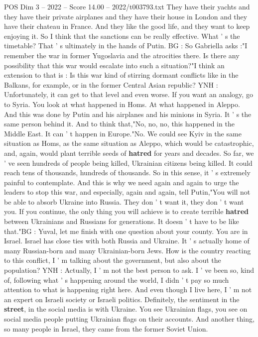 \begin{textsample}{POS Dim 3 – 2022 – Score 14.00 – 2022/t003793.txt}
They have their yachts and they have their private airplanes and they have their house in London and they have their chateau in France.
And they like the good life, and they want to keep enjoying it.
So I think that the sanctions can be really effective.
What ' s the timetable?
That ' s ultimately in the hands of Putin.
BG : So Gabriella asks :"I remember the war in former Yugoslavia and the atrocities there.
Is there any possibility that this war would escalate into such a situation?"I think an extension to that is : Is this war kind of stirring dormant conflicts like in the Balkans, for example, or in the former Central Asian republic?
YNH : Unfortunately, it can get to that level and even worse.
If you want an analogy, go to Syria.
You look at what happened in Homs.
At what happened in Aleppo.
And this was done by Putin and his airplanes and his minions in Syria.
It ' s the same person behind it.
And to think that,"No, no, no, this happened in the Middle East.
It can ' t happen in Europe."No.
We could see Kyiv in the same situation as Homs, as the same situation as Aleppo, which would be catastrophic, and, again, would plant terrible seeds of \textbf{hatred} for years and decades.
So far, we ' ve seen hundreds of people being killed, Ukrainian citizens being killed.
It could reach tens of thousands, hundreds of thousands.
So in this sense, it ' s extremely painful to contemplate.
And this is why we need again and again to urge the leaders to stop this war, and especially, again and again, tell Putin,"You will not be able to absorb Ukraine into Russia.
They don ' t want it, they don ' t want you.
If you continue, the only thing you will achieve is to create terrible \textbf{hatred} between Ukrainians and Russians for generations.
It doesn ' t have to be like that."BG : Yuval, let me finish with one question about your county.
You are in Israel.
Israel has close ties with both Russia and Ukraine.
It ' s actually home of many Russian-born and many Ukrainian-born Jews.
How is the country reacting to this conflict, I ' m talking about the government, but also about the population?
YNH : Actually, I ' m not the best person to ask.
I ' ve been so, kind of, following what ' s happening around the world, I didn ' t pay so much attention to what is happening right here.
And even though I live here, I ' m not an expert on Israeli society or Israeli politics.
Definitely, the sentiment in the \textbf{street}, in the social media is with Ukraine.
You see Ukrainian flags, you see on social media people putting Ukrainian flags on their accounts.
And another thing, so many people in Israel, they came from the former Soviet Union.

\end{textsample}
